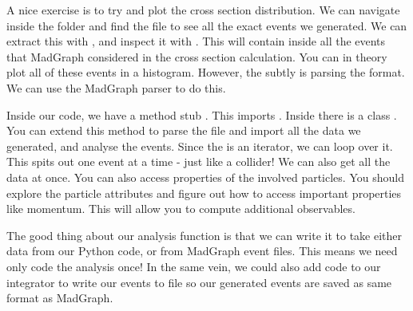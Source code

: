 A nice exercise is to try and plot the cross section distribution. We can navigate inside the folder  and find the file  to see all the exact events we generated. We can extract this with , and inspect it with . This will contain inside all the events that MadGraph considered in the cross section calculation.  You can in theory plot all of these events in a histogram. However, the subtly is parsing the format. We can use the MadGraph parser to do this. 

Inside our code, we have a method stub . This imports . Inside there is a class . You can extend this method to parse the file and import all the data we generated, and analyse the events. Since the  is an iterator, we can loop over it. This spits out one event at a time - just like a collider! We can also get all the data at once. You can also access properties of the involved particles. You should explore the particle attributes and figure out how to access important properties like momentum. This will allow you to compute additional observables.

The good thing about our analysis function is that we can write it to take either data from our Python code, or from MadGraph event files. This means we need only code the analysis once! In the same vein, we could also add code to our integrator to write our events to file so our generated events are saved as same format as MadGraph.














 








